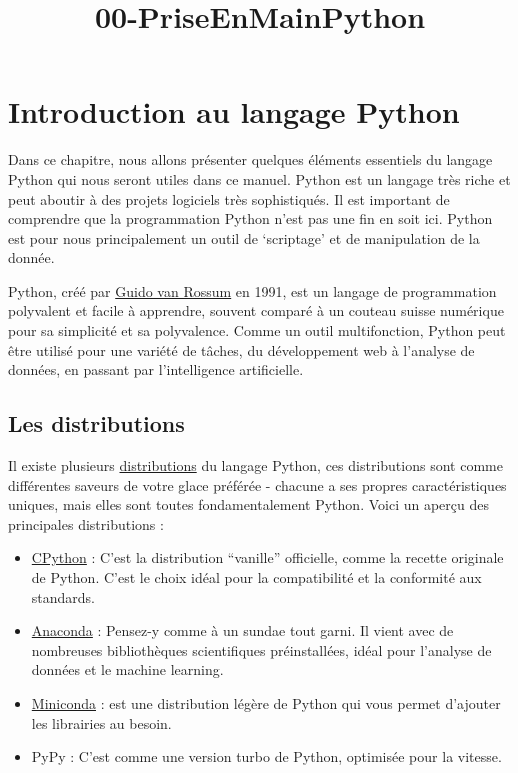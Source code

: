 \documentclass[11pt]{article}
\title{00-PriseEnMainPython}
\begin{document}
    
    \maketitle
    
    

    
    \hypertarget{sec-chap00}{%
\section{Introduction au langage Python}\label{sec-chap00}}

Dans ce chapitre, nous allons présenter quelques éléments essentiels du
langage Python qui nous seront utiles dans ce manuel. Python est un
langage très riche et peut aboutir à des projets logiciels très
sophistiqués. Il est important de comprendre que la programmation Python
n'est pas une fin en soit ici. Python est pour nous principalement un
outil de `scriptage' et de manipulation de la donnée.

Python, créé par
\href{https://en.wikipedia.org/wiki/Guido_van_Rossum}{Guido van Rossum}
en 1991, est un langage de programmation polyvalent et facile à
apprendre, souvent comparé à un couteau suisse numérique pour sa
simplicité et sa polyvalence. Comme un outil multifonction, Python peut
être utilisé pour une variété de tâches, du développement web à
l'analyse de données, en passant par l'intelligence artificielle.

\hypertarget{les-distributions}{%
\subsection{Les distributions}\label{les-distributions}}

Il existe plusieurs
\href{https://wiki.python.org/moin/PythonDistributions}{distributions}
du langage Python, ces distributions sont comme différentes saveurs de
votre glace préférée - chacune a ses propres caractéristiques uniques,
mais elles sont toutes fondamentalement Python. Voici un aperçu des
principales distributions :

\begin{itemize}
\item
  \href{https://www.python.org/downloads/}{CPython} : C'est la
  distribution ``vanille'' officielle, comme la recette originale de
  Python. C'est le choix idéal pour la compatibilité et la conformité
  aux standards.
\item
  \href{https://www.anaconda.com/download}{Anaconda} : Pensez-y comme à
  un sundae tout garni. Il vient avec de nombreuses bibliothèques
  scientifiques préinstallées, idéal pour l'analyse de données et le
  machine learning.
\item
  \href{https://docs.anaconda.com/miniconda/miniconda-install/}{Miniconda}
  : est une distribution légère de Python qui vous permet d'ajouter les
  librairies au besoin.
\item
  PyPy : C'est comme une version turbo de Python, optimisée pour la
  vitesse.
\end{itemize}
\end{document}
